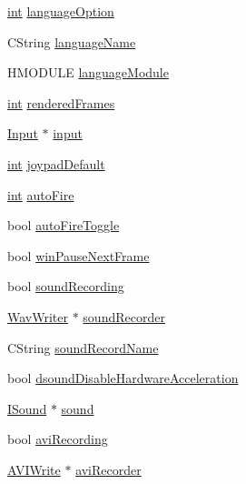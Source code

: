\begin{DoxyCompactItemize}
\item 
\mbox{\hyperlink{_util_8cpp_a0ef32aa8672df19503a49fab2d0c8071}{int}} \mbox{\hyperlink{class_v_b_a_ac747a07ec2db4bcddea1b4581ebe5c6b}{language\+Option}}
\item 
C\+String \mbox{\hyperlink{class_v_b_a_a9763c257edcdac0bff2b0ecab70ffc80}{language\+Name}}
\item 
H\+M\+O\+D\+U\+LE \mbox{\hyperlink{class_v_b_a_ae4c01c2d55e31b9b29a850d22e691df8}{language\+Module}}
\item 
\mbox{\hyperlink{_util_8cpp_a0ef32aa8672df19503a49fab2d0c8071}{int}} \mbox{\hyperlink{class_v_b_a_a05df4a540441a0a8862376af6a2fc57b}{rendered\+Frames}}
\item 
\mbox{\hyperlink{class_input}{Input}} $\ast$ \mbox{\hyperlink{class_v_b_a_aaab971cb5d67a69e1a26502d15a4dc60}{input}}
\item 
\mbox{\hyperlink{_util_8cpp_a0ef32aa8672df19503a49fab2d0c8071}{int}} \mbox{\hyperlink{class_v_b_a_af42f79cc8ea9f0f95bf4634c0b9224dd}{joypad\+Default}}
\item 
\mbox{\hyperlink{_util_8cpp_a0ef32aa8672df19503a49fab2d0c8071}{int}} \mbox{\hyperlink{class_v_b_a_a1a3c37d6609939c821133cf4a2cd9d0d}{auto\+Fire}}
\item 
bool \mbox{\hyperlink{class_v_b_a_a846626fa8ac7d18c7622e4ec49c526ff}{auto\+Fire\+Toggle}}
\item 
bool \mbox{\hyperlink{class_v_b_a_a76ae27aad714b508806d1799afe97a50}{win\+Pause\+Next\+Frame}}
\item 
bool \mbox{\hyperlink{class_v_b_a_ae4be99a1a898dc5a3fceed0edeb0c1b0}{sound\+Recording}}
\item 
\mbox{\hyperlink{class_wav_writer}{Wav\+Writer}} $\ast$ \mbox{\hyperlink{class_v_b_a_ae263135c638f224f26d2f2bfbd069840}{sound\+Recorder}}
\item 
C\+String \mbox{\hyperlink{class_v_b_a_a11f02b69eef7e9b876a2f93d6c2f015e}{sound\+Record\+Name}}
\item 
bool \mbox{\hyperlink{class_v_b_a_a58f89c52283d10a0fcaac8abb7eca524}{dsound\+Disable\+Hardware\+Acceleration}}
\item 
\mbox{\hyperlink{class_i_sound}{I\+Sound}} $\ast$ \mbox{\hyperlink{class_v_b_a_ac6befecbeb59eb76556d3d7490e0452c}{sound}}
\item 
bool \mbox{\hyperlink{class_v_b_a_a96743b6c6ee2d9b45c52b981136e3738}{avi\+Recording}}
\item 
\mbox{\hyperlink{class_a_v_i_write}{A\+V\+I\+Write}} $\ast$ \mbox{\hyperlink{class_v_b_a_a761be1e36182d12710a199a50c0df020}{avi\+Recorder}}

\end{DoxyCompactItemize}
